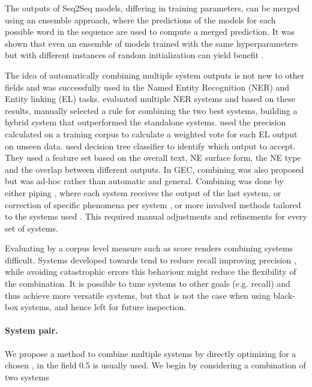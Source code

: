 \documentclass[11pt,a4paper]{article}
\begin{document}
 The outputs of Seq2Seq models, differing in training parameters, can be merged using an ensemble approach, where the predictions of the models for each possible word in the sequence are used to compute a merged prediction.  It was shown that even an ensemble of models trained with the same hyperparameters but with different instances of random initialization can yield benefit \cite{JunczysDowmunt2018ApproachingNG}.
 
 The idea of automatically combining multiple system outputs is not new to other fields and was successfully used in the Named Entity Recognition (NER) and Entity linking (EL) tasks.
 \citet{jiang2016evaluating} evaluated multiple NER systems and based on these results, manually selected a rule for combining the two best systems, building a hybrid system that outperformed the standalone systems.
 \citet{ruiz2015combining} used the precision calculated on a training corpus to calculate a weighted vote for each EL output on unseen data.
 \citet{dlugolinsky2013combining} used decision tree classifier to identify which output to accept. They used a feature set based on the overall text, NE surface form, the NE type and the overlap between different outputs. In GEC, combining was also proposed but was ad-hoc rather than automatic and general. Combining was done by either piping \cite{rozovskaya2016grammatical}, where each system receives the output of the last system, or correction of specific phenomena per system \cite{rozovskaya2011Algorithm}, or more involved methods tailored to the systems used \cite{grundkiewicz2018near}. This required manual adjustments and refinements for every set of systems.

 Evaluating by a corpus level measure such as  score renders combining systems difficult. Systems developed towards  tend to reduce recall improving precision \cite{choshen2018inherent}, while avoiding catastrophic errors \cite{choshen2018reference} this behaviour might reduce the flexibility of the combination. It is possible to tune systems to other goals (e.g. recall) \cite{grundkiewicz2018near} and thus achieve more versatile systems, but that is not the case when using black-box systems, and hence left for future inspection.


 \paragraph{System pair.} We propose a method to combine multiple systems by directly optimizing  for a chosen , in the field 0.5 is usually used. We begin by considering a combination of two systems
 
\end{document}
